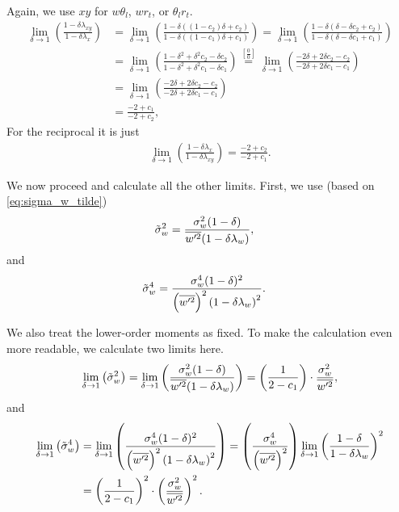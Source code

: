 Again, we use $xy$ for $w\theta_l$, $wr_t$, or $\theta_l r_t$.
\begin{align}
    \lim_{\delta \to 1} \left(\frac{1 - \delta \lambda_{xy}}{1 - \delta \lambda_x}\right)
    &= \lim_{\delta \to 1} \left(\frac{1 - \delta ((1 - c_2) \delta + c_2)}{1 - \delta ((1 - c_1) \delta + c_1)}\right)
    = \lim_{\delta \to 1} \left(\frac{1 - \delta (\delta - \delta c_2 + c_2)}{1 - \delta (\delta - \delta c_1 + c_1)}\right) \\
    &= \lim_{\delta \to 1} \left(\frac{1 - \delta^2 + \delta^2 c_2 - \delta c_2}{1 - \delta^2 + \delta^2 c_1 - \delta c_1}\right)
    \overset{\left[\frac{0}{0}\right]}{=}
    \lim_{\delta \to 1} \left(\frac{- 2\delta + 2\delta c_2 - c_2}{- 2\delta + 2\delta c_1 - c_1}\right) \\
    &= \lim_{\delta \to 1} \left(\frac{- 2\delta + 2\delta c_2 - c_2}{- 2\delta + 2\delta c_1 - c_1}\right) \\
    &= \frac{-2 + c_1}{-2 + c_2},
\end{align}
For the reciprocal it is just
\begin{align}
    \lim_{\delta \to 1} \left(\frac{1 - \delta \lambda_x}{1 - \delta \lambda_{xy}}\right) = \frac{-2 + c_2}{-2 + c_1}.
\end{align}

We now proceed and calculate all the other limits.
First, we use (based on \cref{eq:sigma_w_tilde})
\begin{align}
    \label{eq:sigma_w_tilde_2}
    {\tilde{\sigma}_w}^2
    &= \frac{\sigma_w^2 (1-\delta)}{\overline{w'^2} (1-\delta\lambda_w)},
\end{align}
and
\begin{align}
    \label{eq:sigma_w_tilde_4}
    {\tilde{\sigma}_w}^4
    &= \frac{\sigma_w^4 (1-\delta)^2}{\left(\overline{w'^2}\right)^2 \left(1-\delta\lambda_w\right)^2}.
\end{align}

We also treat the lower-order moments as fixed.
To make the calculation even more readable,
we calculate two limits here.
\begin{align}
    \label{eq:sigma_w_tilde_2_limit_delta_to_1}
    \lim_{\delta \to 1}\left({\tilde{\sigma}_w}^2\right)
    = \lim_{\delta \to 1}\left(\frac{\sigma_w^2 (1-\delta)}{\overline{w'^2} (1-\delta\lambda_w)}\right)
    = \left(\frac{1}{2 - c_1}\right) \cdot \frac{\sigma_w^2}{\overline{w'^2}},
\end{align}
and
\begin{align}
    \label{eq:sigma_w_tilde_4_limit_delta_to_1}
    \lim_{\delta \to 1}\left({\tilde{\sigma}_w}^4\right)
    &= \lim_{\delta \to 1}\left(\frac{\sigma_w^4 (1-\delta)^2}{\left(\overline{w'^2}\right)^2 \left(1-\delta\lambda_w\right)^2}\right)
    = \left(\frac{\sigma_w^4}{\left(\overline{w'^2}\right)^2}\right) \lim_{\delta \to 1} \left(\frac{1-\delta}{1-\delta\lambda_w}\right)^2 \\
    &= \left(\frac{1}{2 - c_1}\right)^2 \cdot \left(\frac{\sigma_w^2}{\overline{w'^2}}\right)^2.
\end{align}

